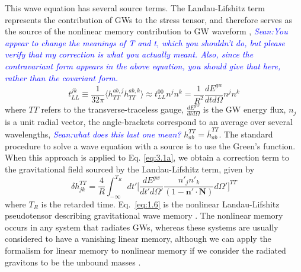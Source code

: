 \documentclass[twocolumn,showpacs,aps,prd,nobibnotes,floatfix]{revtex4-1}
\newcommand{\stm}[1]{\textcolor{blue}{\textit{Sean:#1}}}
\begin{document}
This wave equation has several source terms. The Landau-Lifshitz term represents the contribution of GWs to the stress tensor,
and therefore serves as the source of the nonlinear memory contribution to GW waveform \cite{Isaacson1968},
\stm{You appear to change the meanings of T and t, which you shouldn't do, but please verify that my correction is what you actually meant. Also, since the contravariant form appears in the above equation, you should give that here, rather than the covariant form.}
\begin{equation}
	t_{LL}^{jk}\equiv \frac{1}{32\pi}\langle h_{TT}^{ab,j}h_{TT}^{ab,k}\rangle\approx t_{LL}^{00}n^{j}n^{k} = \frac{1}{R^{2}}\frac{dE^{gw}}{dt d\Omega}n^{j}n^{k}
\end{equation}
where $TT$ refers to the transverse-traceless gauge, $\frac{dE^{gw}}{dtd\Omega}$ is the GW energy flux, $n_{j}$ is a unit radial vector, the angle-brackets correspond to an average over several wavelengths, \stm{what does this last one mean?} $h^{TT}_{ab}=\bar{h}^{TT}_{ab}$. The standard procedure to solve a wave equation with a source is to use the Green's function. When this approach is applied to Eq. \ref{eq:3.1a}, we obtain a correction term to the gravitational field sourced by the Landau-Lifshitz term, given by \cite{Wiseman1991}
\begin{equation}\label{eq:1.6}
	\delta h^{TT}_{jk} = \frac{4}{R}\int_{-\infty}^{T_{R}} dt'\Bigg[ \frac{dE^{gw}}{dt'd\Omega'}\frac{n'_{j}n'_{k}}{(1-\boldsymbol{n'}\cdot\boldsymbol{N})}d\Omega'\Bigg]^{TT}
\end{equation}
where $T_{R}$ is the retarded time. Eq.~\ref{eq:1.6} is the nonlinear Landau-Lifshitz pseudotensor describing gravitational wave memory \cite{Christodoulou1991, Payne1894, Blanchet_Damour1992}. The nonlinear memory occurs in any system that radiates GWs, whereas these systems are usually considered to have a vanishing linear memory, although we can apply the formalism for linear memory to nonlinear memory if 
we consider the radiated gravitons to be the unbound masses \cite{Thorne1992}.
\end{document}
